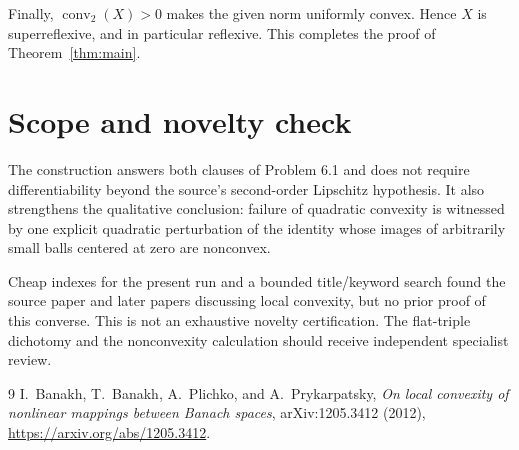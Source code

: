 \documentclass[11pt]{article}
\begin{document}
Finally, $\operatorname{conv}_2(X)>0$ makes the given norm uniformly convex.
Hence $X$ is superreflexive, and in particular reflexive.  This completes
the proof of Theorem~\ref{thm:main}.

\section{Scope and novelty check}

The construction answers both clauses of Problem 6.1 and does not require
differentiability beyond the source's second-order Lipschitz hypothesis.
It also strengthens the qualitative conclusion: failure of quadratic
convexity is witnessed by one explicit quadratic perturbation of the
identity whose images of arbitrarily small balls centered at zero are
nonconvex.

Cheap indexes for the present run and a bounded title/keyword search found
the source paper and later papers discussing local convexity, but no prior
proof of this converse.  This is not an exhaustive novelty certification.
The flat-triple dichotomy and the nonconvexity calculation should receive
independent specialist review.

\begin{thebibliography}{9}
I.~Banakh, T.~Banakh, A.~Plichko, and A.~Prykarpatsky,
\emph{On local convexity of nonlinear mappings between Banach spaces},
arXiv:1205.3412 (2012),
\url{https://arxiv.org/abs/1205.3412}.
\end{thebibliography}
\end{document}
